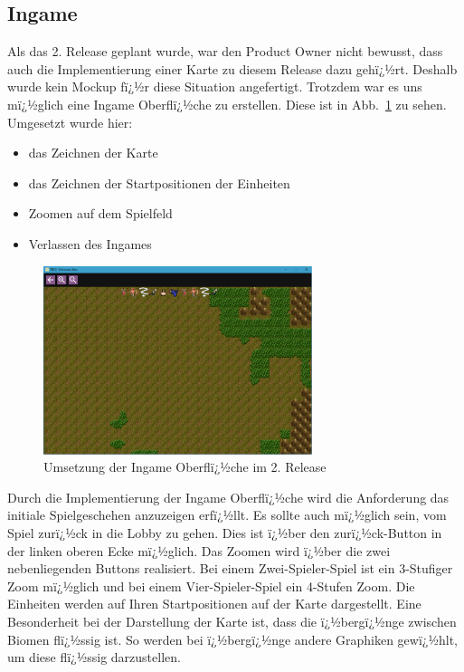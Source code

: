 \documentclass[12pt, titlepage]{scrartcl}
\newcommand{\Abb}[1]{%
	Abb.\ \ref{#1}%
}
\begin{document}
			\subsection{Ingame}
			Als das 2. Release geplant wurde, war den Product Owner nicht bewusst, dass auch die Implementierung einer Karte zu diesem Release dazu gehï¿½rt. Deshalb wurde kein Mockup fï¿½r diese Situation angefertigt. Trotzdem war es uns mï¿½glich eine Ingame Oberflï¿½che zu erstellen. Diese ist in \Abb{Ingame} zu sehen. Umgesetzt wurde hier:
			\begin{itemize}
				\item das Zeichnen der Karte
				\item das Zeichnen der Startpositionen der Einheiten
				\item Zoomen auf dem Spielfeld
				\item Verlassen des Ingames
			\end{itemize}
			\begin{figure}[H] 
				\centering
				\includegraphics[width=0.7\textwidth]{Ingame_final.PNG}
				\caption{Umsetzung der Ingame Oberflï¿½che im 2. Release}
				\label{Ingame}
			\end{figure}
			Durch die Implementierung der Ingame Oberflï¿½che wird die Anforderung das initiale Spielgeschehen anzuzeigen erfï¿½llt. Es sollte auch mï¿½glich sein, vom Spiel zurï¿½ck in die Lobby zu gehen. Dies ist ï¿½ber den zurï¿½ck-Button in der linken oberen Ecke mï¿½glich. Das Zoomen wird ï¿½ber die zwei nebenliegenden Buttons realisiert. Bei einem Zwei-Spieler-Spiel ist ein 3-Stufiger Zoom mï¿½glich und bei einem Vier-Spieler-Spiel ein 4-Stufen Zoom. Die Einheiten werden auf Ihren Startpositionen auf der Karte dargestellt. Eine Besonderheit bei der Darstellung der Karte ist, dass die ï¿½bergï¿½nge zwischen Biomen flï¿½ssig ist. So werden bei ï¿½bergï¿½nge andere Graphiken gewï¿½hlt, um diese flï¿½ssig darzustellen.
			
\end{document}
